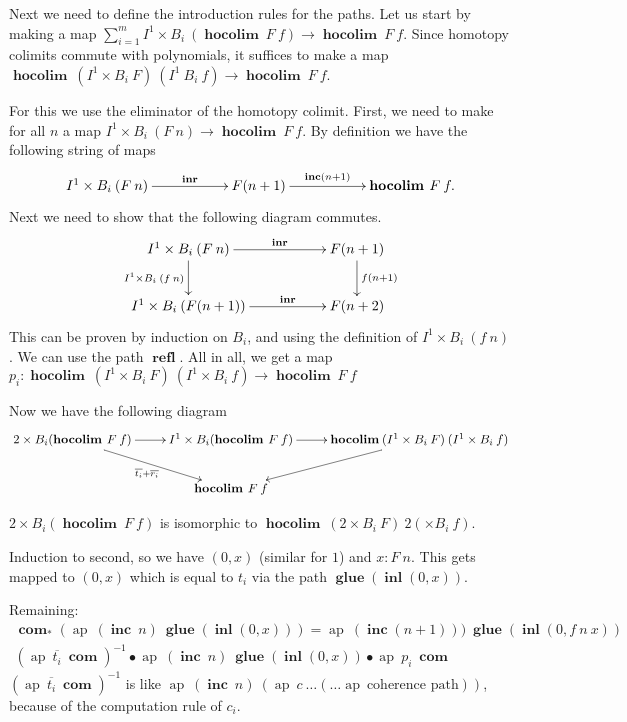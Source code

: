 \documentclass[a4paper,UKenglish]{lipics-v2016}
\newcommand{\conc}[0]{\bullet}
\newcommand{\ap}[0]{\operatorname{ap}}
\newcommand{\refl}[0]{\operatorname{\textbf{refl}}}
\newcommand{\hocolim}[0]{\operatorname{\textbf{hocolim}}}
\newcommand{\inl}[0]{\operatorname{\textbf{inl}}}
\newcommand{\inr}[0]{\operatorname{\textbf{inr}}}
\newcommand{\glue}[0]{\operatorname{\textbf{glue}}}
\newcommand{\inc}[0]{\operatorname{\textbf{inc}}}
\newcommand{\com}[0]{\operatorname{\textbf{com}}}
\begin{document}
Next we need to define the introduction rules for the paths.
Let us start by making a map $\sum_{i = 1}^m I^1 \times B_i \> (\hocolim \> F \> f) \rightarrow \hocolim \> F \> f$.
Since homotopy colimits commute with polynomials, it suffices to make a map $\hocolim \> (I^1 \times B_i \> F) \> (I^1 \> B_i \> f)  \rightarrow \hocolim \> F \> f$.

For this we use the eliminator of the homotopy colimit.
First, we need to make for all $n$ a map $I^1 \times B_i \> (F \> n)  \rightarrow \hocolim \> F \> f$.
By definition we have the following string of maps
\[
\xymatrix
{
	I^1 \times B_i \> (F \> n) \ar[rr]^-{\inr} & & F(n+1) \ar[rr]^-{\inc(n+1)} & & \hocolim \> F \> f.
}
\]
Next we need to show that the following diagram commutes.
\[
\xymatrix
{
	I^1 \times B_i \> (F \> n) \ar[rr]^-{\inr} \ar[d]_{I^1 \times B_i \> (f \> n)} & & F(n+1) \ar[d]^{f(n+1)}\\
	I^1 \times B_i \> (F(n+1)) \ar[rr]^-{\inr} & & F(n+2)
}
\]
This can be proven by induction on $B_i$, and using the definition of $I^1 \times B_i \> (f \> n)$.
We can use the path $\refl$.
All in all, we get a map $p_i : \hocolim \> (I^1 \times B_i \> F) \> (I^1 \times B_i \> f) \rightarrow \hocolim \> F \> f$

Now we have the following diagram
\[
\xymatrix
{
	2 \times B_i(\hocolim \> F \> f) \ar[r] \ar[dr]_{\overline{t_i} + \overline{r_i}} & I^1 \times B_i(\hocolim \> F \> f) \ar[r] & \hocolim \> (I^1 \times B_i \> F) \> (I^1 \times B_i \> f) \ar[dl]\\
	& \hocolim \> F \> f
}
\]

$2 \times B_i(\hocolim \> F \> f)$ is isomorphic to $\hocolim \> (2 \times B_i \> F) \> 2 (\times B_i \> f)$.

Induction to second, so we have $(0, x)$ (similar for $1$) and $x : F \> n$.
This gets mapped to $(0, x)$ which is equal to $t_i$ via the path $\glue (\inl (0, x))$.

Remaining:
\begin{equation*}
\begin{split}
\com_*(\ap \> (\inc \> n) \> \glue (\inl (0, x))) = \ap \> (\inc (n+1))) \>\glue (\inl (0, f \> n \> x))\\
(\ap \> \overline{t_i} \> \com)^{-1} \conc \ap \> (\inc \> n) \> \glue (\inl (0, x)) \conc \ap \> p_i \> \com
\end{split}
\end{equation*}
$(\ap \> \overline{t_i} \> \com)^{-1}$ is like $\ap \> (\inc \> n) \> (\ap \> c \> \ldots (\ldots \ap \> \text{coherence path}))$, because of the computation rule of $c_i$.
\end{document}
